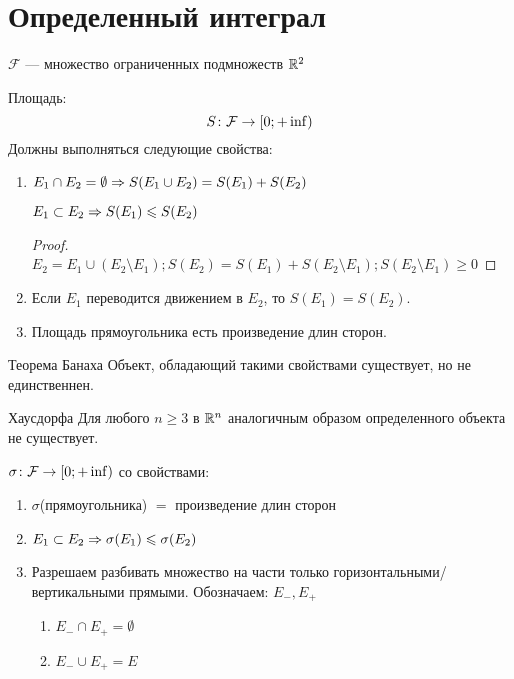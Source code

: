 ﻿\section{Определенный интеграл}

\begin{Def}
	$\mathcal{F}$ --- множество ограниченных подмножеств $\mathbb{R}^2$
\end{Def}

\begin{Def}
	Площадь:
	\[ S\colon \mathcal{F} \rightarrow [0; +\inf) \]
	Должны выполняться следующие свойства:

	\begin{enumerate}
	\item 
		$E_1 \cap E_2 = \emptyset \Rightarrow S(E_1 \cup E_2) = S(E_1) + S(E_2)$
		\begin{conseq*}
			$E_1 \subset E_2 \Rightarrow S(E_1) \leqslant S(E_2)$
		\end{conseq*}
		\begin{proof}
			$E_2 = E_1 \cup (E_2 \setminus E_1); S(E_2) = S(E_1) + S(E_2 \setminus E_1); S(E_2 \setminus E_1) \geqslant 0$
		\end{proof}
	
	\item 
		Если $E_1$ переводится движением в $E_2$, то $S(E_1) = S(E_2)$.

	\item 
		Площадь прямоугольника есть произведение длин сторон.
	\end{enumerate} 
\end{Def}

\begin{theorem}{Теорема Банаха}
	Объект, обладающий такими свойствами существует, но не единственнен.
\end{theorem}

\begin{theorem}{Хаусдорфа}
	Для любого $n \ge 3$ в $\mathbb{R}^n$ аналогичным образом определенного объекта не существует.
\end{theorem}

\begin{Def}
	$\sigma\colon \mathcal{F} \rightarrow [0; +\inf)$ со свойствами:
	\begin{enumerate}
	\item 
		$\sigma$(прямоугольника) $=$ произведение длин сторон

	\item 
		$E_1 \subset E_2 \Rightarrow \sigma(E_1) \leqslant \sigma(E_2)$
	
	\item 
		Разрешаем разбивать множество на части только горизонтальными/вертикальными прямыми. Обозначаем: $E_{-}, E_{+}$
		\begin{enumerate}
			\item $E_{-} \cap E_{+} = \emptyset$
			\item $E_{-} \cup E_{+} = E$
		\end{enumerate}
	\end{enumerate} 
\end{Def}

